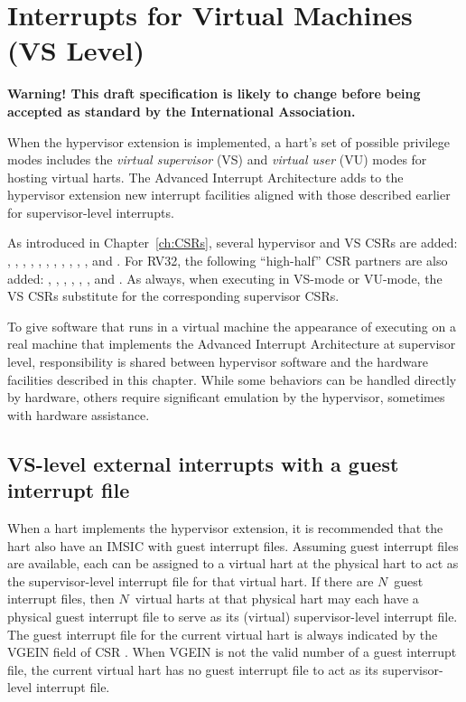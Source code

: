 
\chapter{Interrupts for Virtual Machines (VS Level)}
\label{ch:VSLevel}

\textbf{%
Warning!
This draft specification is likely to change before being accepted as
standard by the {\RISCV} International Association.%
}
\bigskip

When the hypervisor extension is implemented, a hart's set of possible
privilege modes includes the \emph{virtual supervisor} (VS) and
\emph{virtual user} (VU) modes for hosting virtual harts.
The Advanced Interrupt Architecture adds to the hypervisor extension
new interrupt facilities aligned with those described earlier for
supervisor-level interrupts.

As introduced in Chapter~\ref{ch:CSRs}, several hypervisor and VS CSRs
are added:  , , , ,
, , , ,
, , , and .
For RV32, the following ``high-half'' CSR partners are also added:
, , , , ,
, and .
As always, when executing in \mbox{VS-mode} or \mbox{VU-mode}, the
VS CSRs substitute for the corresponding supervisor CSRs.

To give software that runs in a virtual machine the appearance of
executing on a real machine that implements the Advanced Interrupt
Architecture at supervisor level, responsibility is shared between
hypervisor software and the hardware facilities described in this
chapter.
While some behaviors can be handled directly by hardware, others
require significant emulation by the hypervisor, sometimes with
hardware assistance.

\section{VS-level external interrupts with a guest interrupt file}

When a hart implements the hypervisor extension, it is recommended that
the hart also have an IMSIC with guest interrupt files.
Assuming guest interrupt files are available, each can be assigned
to a virtual hart at the physical hart to act as the supervisor-level
interrupt file for that virtual hart.
If there are $N$~guest interrupt files, then $N$~virtual harts at that
physical hart may each have a physical guest interrupt file to serve as
its (virtual) supervisor-level interrupt file.
The guest interrupt file for the current virtual hart is always
indicated by the VGEIN field of CSR .
When VGEIN is not the valid number of a guest interrupt file, the
current virtual hart has no guest interrupt file to act as its
supervisor-level interrupt file.

